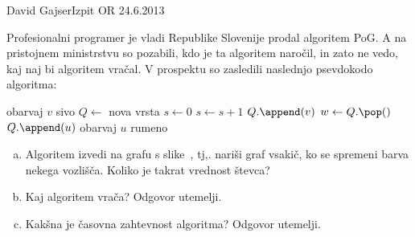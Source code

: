 \begin{naloga}{David Gajser}{Izpit OR 24.6.2013}
\begin{vprasanje}
Profesionalni programer je vladi Republike Slovenije
prodal algoritem {\sc PoG}.
A na pristojnem ministrstvu so pozabili, kdo je ta algoritem naročil,
in zato ne vedo, kaj naj bi algoritem vračal.
V prospektu so zasledili naslednjo psevdokodo algoritma:
\begin{small}
\begin{algorithmic}
    \State obarvaj $v$ sivo
\EndFor
\State $Q \gets$ nova vrsta
\State $s \gets 0$
        \State $s \gets s+1$
        \State $Q.\append(v)$
            \State $w \gets Q.\pop()$
                    \State $Q.\append(u)$
                    \State obarvaj $u$ rumeno
                \EndIf
            \EndFor
        \EndWhile
    \EndIf
\EndFor
\State {}
\end{algorithmic}
\end{small}

\begin{enumerate}[(a)]
\item Algoritem izvedi na grafu s slike~\fig,
tj,. nariši graf vsakič, ko se spremeni barva nekega vozlišča.
Koliko je takrat vrednost števca?

\item Kaj algoritem vrača?
Odgovor utemelji.

\item Kakšna je časovna zahtevnost algoritma?
Odgovor utemelji.
\end{enumerate}

\begin{slika}
\pgfslika
{}
\end{slika}
\end{vprasanje}
\begin{odgovor}
\end{odgovor}
\end{naloga}

